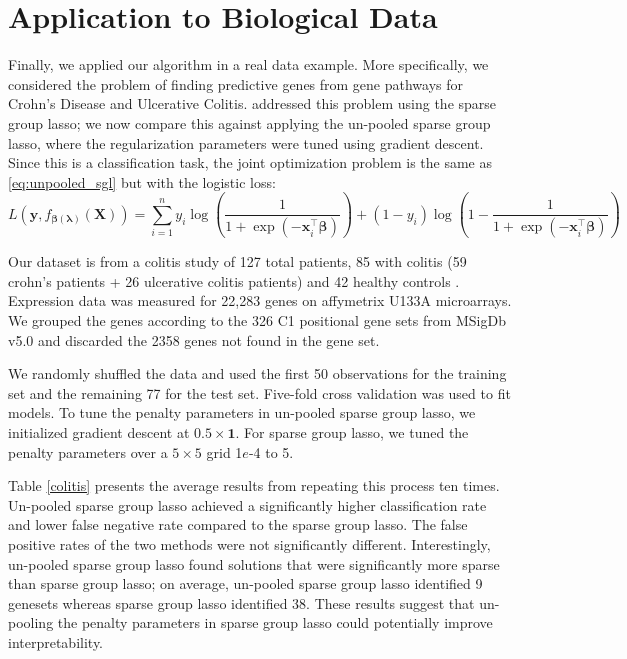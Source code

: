 \documentclass[12pt]{article}
\begin{document}
\section{Application to Biological Data}\label{realDataResults}
Finally, we applied our algorithm in a real data example. More specifically, we considered the problem of finding predictive genes from gene pathways for Crohn's Disease and Ulcerative Colitis. \citet{simon2013sparse} addressed this problem using the sparse group lasso; we now compare this against applying the un-pooled sparse group lasso, where the regularization parameters were tuned using gradient descent. Since this is a classification task, the joint optimization problem is the same as \eqref{eq:unpooled_sgl} but with the logistic loss:
\begin{equation}
L\left ( \boldsymbol{y}, f_{\boldsymbol \beta(\boldsymbol\lambda)}(\boldsymbol{X}) \right ) = \sum_{i=1}^{n} y_{i} \log \left ( \frac{1}{1+\exp(-\boldsymbol x_{i}^\top \boldsymbol \beta)} \right ) + (1- y_i)\log \left (1 - \frac{1}{1+\exp(-\boldsymbol x_i^\top \boldsymbol \beta)} \right)
\end{equation}


Our dataset is from a colitis study of 127 total patients, 85 with colitis (59 crohn's patients + 26 ulcerative colitis patients) and 42 healthy controls \citep{burczynski2006molecular}. Expression data was measured for 22,283 genes on affymetrix U133A microarrays. We grouped the genes according to the 326 C1 positional gene sets from MSigDb v5.0 \citep{subramanian2005gene} and discarded the 2358 genes not found in the gene set.

We randomly shuffled the data and used the first 50 observations for the training set and the remaining 77 for the test set. Five-fold cross validation was used to fit models. To tune the penalty parameters in un-pooled sparse group lasso, we initialized gradient descent at $0.5 \times \boldsymbol 1$. For sparse group lasso, we tuned the penalty parameters over a $5 \times 5$ grid 1$e$-4 to 5.

Table \ref{colitis} presents the average results from repeating this process ten times. Un-pooled sparse group lasso achieved a significantly higher classification rate and lower false negative rate compared to the sparse group lasso. The false positive rates of the two methods were not significantly different. Interestingly, un-pooled sparse group lasso found solutions that were significantly more sparse than sparse group lasso; on average, un-pooled sparse group lasso identified 9 genesets whereas sparse group lasso identified 38. These results suggest that un-pooling the penalty parameters in sparse group lasso could potentially improve interpretability.
\end{document}
